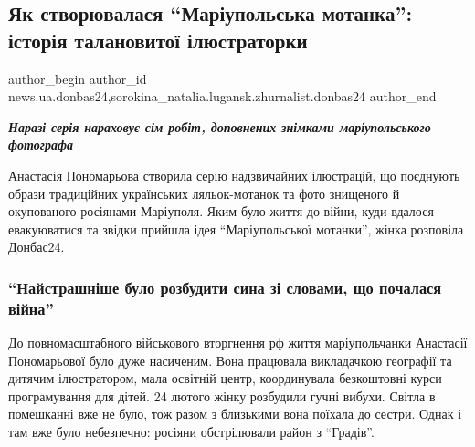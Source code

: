  
 
 
 
 
 
\subsection{Як створювалася \enquote{Маріупольська мотанка}: історія талановитої ілюстраторки}
\label{sec:26_07_2022.stz.news.ua.donbas24.1.mrpl_motanka_istoria_iljustratorky}
 
\ifcmt
 author_begin
   author_id news.ua.donbas24,sorokina_natalia.lugansk.zhurnalist.donbas24
 author_end
\fi

\begin{center}
  \em\color{blue}\bfseries\Large
Наразі серія нараховує сім робіт, доповнених знімками маріупольського фотографа
\end{center}

Анастасія Пономарьова створила серію надзвичайних ілюстрацій, що поєднують
образи традиційних українських ляльок-мотанок та фото знищеного й окупованого
росіянами Маріуполя. Яким було життя до війни, куди вдалося евакуюватися та
звідки прийшла ідея \enquote{Маріупольської мотанки}, жінка розповіла Донбас24.

\subsubsection{\enquote{Найстрашніше було розбудити сина зі словами, що почалася війна}}

До повномасштабного військового вторгнення рф життя маріупольчанки Анастасії
Пономарьової було дуже насиченим. Вона працювала викладачкою географії та
дитячим ілюстратором, мала освітній центр, координувала безкоштовні курси
програмування для дітей. 24 лютого жінку розбудили гучні вибухи. Світла в
помешканні вже не було, тож разом з близькими вона поїхала до сестри. Однак і
там вже було небезпечно: росіяни обстрілювали район з \enquote{Градів}.


